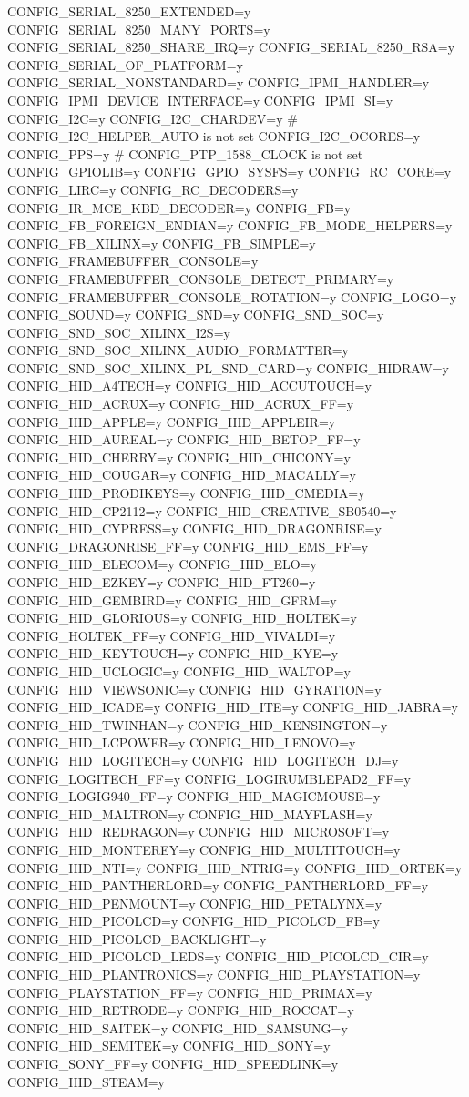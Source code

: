 \begin{CodeBlock}[language=BookConfig]
CONFIG_SERIAL_8250_EXTENDED=y
CONFIG_SERIAL_8250_MANY_PORTS=y
CONFIG_SERIAL_8250_SHARE_IRQ=y
CONFIG_SERIAL_8250_RSA=y
CONFIG_SERIAL_OF_PLATFORM=y
CONFIG_SERIAL_NONSTANDARD=y
CONFIG_IPMI_HANDLER=y
CONFIG_IPMI_DEVICE_INTERFACE=y
CONFIG_IPMI_SI=y
CONFIG_I2C=y
CONFIG_I2C_CHARDEV=y
# CONFIG_I2C_HELPER_AUTO is not set
CONFIG_I2C_OCORES=y
CONFIG_PPS=y
# CONFIG_PTP_1588_CLOCK is not set
CONFIG_GPIOLIB=y
CONFIG_GPIO_SYSFS=y
CONFIG_RC_CORE=y
CONFIG_LIRC=y
CONFIG_RC_DECODERS=y
CONFIG_IR_MCE_KBD_DECODER=y
CONFIG_FB=y
CONFIG_FB_FOREIGN_ENDIAN=y
CONFIG_FB_MODE_HELPERS=y
CONFIG_FB_XILINX=y
CONFIG_FB_SIMPLE=y
CONFIG_FRAMEBUFFER_CONSOLE=y
CONFIG_FRAMEBUFFER_CONSOLE_DETECT_PRIMARY=y
CONFIG_FRAMEBUFFER_CONSOLE_ROTATION=y
CONFIG_LOGO=y
CONFIG_SOUND=y
CONFIG_SND=y
CONFIG_SND_SOC=y
CONFIG_SND_SOC_XILINX_I2S=y
CONFIG_SND_SOC_XILINX_AUDIO_FORMATTER=y
CONFIG_SND_SOC_XILINX_PL_SND_CARD=y
CONFIG_HIDRAW=y
CONFIG_HID_A4TECH=y
CONFIG_HID_ACCUTOUCH=y
CONFIG_HID_ACRUX=y
CONFIG_HID_ACRUX_FF=y
CONFIG_HID_APPLE=y
CONFIG_HID_APPLEIR=y
CONFIG_HID_AUREAL=y
CONFIG_HID_BETOP_FF=y
CONFIG_HID_CHERRY=y
CONFIG_HID_CHICONY=y
CONFIG_HID_COUGAR=y
CONFIG_HID_MACALLY=y
CONFIG_HID_PRODIKEYS=y
CONFIG_HID_CMEDIA=y
CONFIG_HID_CP2112=y
CONFIG_HID_CREATIVE_SB0540=y
CONFIG_HID_CYPRESS=y
CONFIG_HID_DRAGONRISE=y
CONFIG_DRAGONRISE_FF=y
CONFIG_HID_EMS_FF=y
CONFIG_HID_ELECOM=y
CONFIG_HID_ELO=y
CONFIG_HID_EZKEY=y
CONFIG_HID_FT260=y
CONFIG_HID_GEMBIRD=y
CONFIG_HID_GFRM=y
CONFIG_HID_GLORIOUS=y
CONFIG_HID_HOLTEK=y
CONFIG_HOLTEK_FF=y
CONFIG_HID_VIVALDI=y
CONFIG_HID_KEYTOUCH=y
CONFIG_HID_KYE=y
CONFIG_HID_UCLOGIC=y
CONFIG_HID_WALTOP=y
CONFIG_HID_VIEWSONIC=y
CONFIG_HID_GYRATION=y
CONFIG_HID_ICADE=y
CONFIG_HID_ITE=y
CONFIG_HID_JABRA=y
CONFIG_HID_TWINHAN=y
CONFIG_HID_KENSINGTON=y
CONFIG_HID_LCPOWER=y
CONFIG_HID_LENOVO=y
CONFIG_HID_LOGITECH=y
CONFIG_HID_LOGITECH_DJ=y
CONFIG_LOGITECH_FF=y
CONFIG_LOGIRUMBLEPAD2_FF=y
CONFIG_LOGIG940_FF=y
CONFIG_HID_MAGICMOUSE=y
CONFIG_HID_MALTRON=y
CONFIG_HID_MAYFLASH=y
CONFIG_HID_REDRAGON=y
CONFIG_HID_MICROSOFT=y
CONFIG_HID_MONTEREY=y
CONFIG_HID_MULTITOUCH=y
CONFIG_HID_NTI=y
CONFIG_HID_NTRIG=y
CONFIG_HID_ORTEK=y
CONFIG_HID_PANTHERLORD=y
CONFIG_PANTHERLORD_FF=y
CONFIG_HID_PENMOUNT=y
CONFIG_HID_PETALYNX=y
CONFIG_HID_PICOLCD=y
CONFIG_HID_PICOLCD_FB=y
CONFIG_HID_PICOLCD_BACKLIGHT=y
CONFIG_HID_PICOLCD_LEDS=y
CONFIG_HID_PICOLCD_CIR=y
CONFIG_HID_PLANTRONICS=y
CONFIG_HID_PLAYSTATION=y
CONFIG_PLAYSTATION_FF=y
CONFIG_HID_PRIMAX=y
CONFIG_HID_RETRODE=y
CONFIG_HID_ROCCAT=y
CONFIG_HID_SAITEK=y
CONFIG_HID_SAMSUNG=y
CONFIG_HID_SEMITEK=y
CONFIG_HID_SONY=y
CONFIG_SONY_FF=y
CONFIG_HID_SPEEDLINK=y
CONFIG_HID_STEAM=y

\end{CodeBlock}
